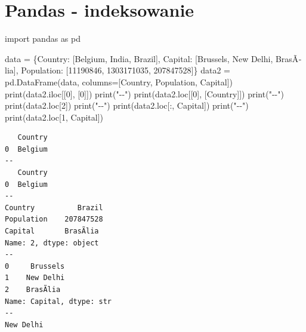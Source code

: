 \documentclass[
  polish,
  letterpaper,
  DIV=11,
  numbers=noendperiod]{scrreprt}
\newenvironment{Shaded}{\begin{snugshade}}{\end{snugshade}}
\newcommand{\BuiltInTok}[1]{\textcolor[rgb]{0.00,0.23,0.31}{#1}}
\newcommand{\DecValTok}[1]{\textcolor[rgb]{0.68,0.00,0.00}{#1}}
\newcommand{\ImportTok}[1]{\textcolor[rgb]{0.00,0.46,0.62}{#1}}
\newcommand{\NormalTok}[1]{\textcolor[rgb]{0.00,0.23,0.31}{#1}}
\newcommand{\OperatorTok}[1]{\textcolor[rgb]{0.37,0.37,0.37}{#1}}
\newcommand{\StringTok}[1]{\textcolor[rgb]{0.13,0.47,0.30}{#1}}
\begin{document}
\chapter{Pandas - indeksowanie}\label{pandas---indeksowanie}

\begin{Shaded}
\begin{Highlighting}[]
\ImportTok{import}\NormalTok{ pandas }\ImportTok{as}\NormalTok{ pd}

\NormalTok{data }\OperatorTok{=}\NormalTok{ \{}\StringTok{\textquotesingle{}Country\textquotesingle{}}\NormalTok{: [}\StringTok{\textquotesingle{}Belgium\textquotesingle{}}\NormalTok{, }\StringTok{\textquotesingle{}India\textquotesingle{}}\NormalTok{, }\StringTok{\textquotesingle{}Brazil\textquotesingle{}}\NormalTok{],}
        \StringTok{\textquotesingle{}Capital\textquotesingle{}}\NormalTok{: [}\StringTok{\textquotesingle{}Brussels\textquotesingle{}}\NormalTok{, }\StringTok{\textquotesingle{}New Delhi\textquotesingle{}}\NormalTok{, }\StringTok{\textquotesingle{}BrasÃ­lia\textquotesingle{}}\NormalTok{],}
        \StringTok{\textquotesingle{}Population\textquotesingle{}}\NormalTok{: [}\DecValTok{11190846}\NormalTok{, }\DecValTok{1303171035}\NormalTok{, }\DecValTok{207847528}\NormalTok{]\}}
\NormalTok{data2 }\OperatorTok{=}\NormalTok{ pd.DataFrame(data, columns}\OperatorTok{=}\NormalTok{[}\StringTok{\textquotesingle{}Country\textquotesingle{}}\NormalTok{, }\StringTok{\textquotesingle{}Population\textquotesingle{}}\NormalTok{, }\StringTok{\textquotesingle{}Capital\textquotesingle{}}\NormalTok{])}
\BuiltInTok{print}\NormalTok{(data2.iloc[[}\DecValTok{0}\NormalTok{], [}\DecValTok{0}\NormalTok{]])}
\BuiltInTok{print}\NormalTok{(}\StringTok{"{-}{-}"}\NormalTok{)}
\BuiltInTok{print}\NormalTok{(data2.loc[[}\DecValTok{0}\NormalTok{], [}\StringTok{\textquotesingle{}Country\textquotesingle{}}\NormalTok{]])}
\BuiltInTok{print}\NormalTok{(}\StringTok{"{-}{-}"}\NormalTok{)}
\BuiltInTok{print}\NormalTok{(data2.loc[}\DecValTok{2}\NormalTok{])}
\BuiltInTok{print}\NormalTok{(}\StringTok{"{-}{-}"}\NormalTok{)}
\BuiltInTok{print}\NormalTok{(data2.loc[:, }\StringTok{\textquotesingle{}Capital\textquotesingle{}}\NormalTok{])}
\BuiltInTok{print}\NormalTok{(}\StringTok{"{-}{-}"}\NormalTok{)}
\BuiltInTok{print}\NormalTok{(data2.loc[}\DecValTok{1}\NormalTok{, }\StringTok{\textquotesingle{}Capital\textquotesingle{}}\NormalTok{])}
\end{Highlighting}
\end{Shaded}

\begin{verbatim}
   Country
0  Belgium
--
   Country
0  Belgium
--
Country          Brazil
Population    207847528
Capital       BrasÃ­lia
Name: 2, dtype: object
--
0     Brussels
1    New Delhi
2    BrasÃ­lia
Name: Capital, dtype: str
--
New Delhi
\end{verbatim}
\end{document}
